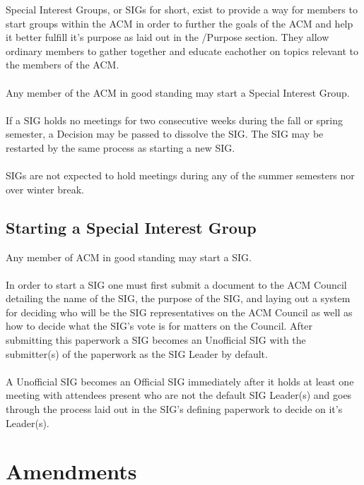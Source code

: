 \documentclass[12pt,titlepage]{article}
\begin{document}
Special Interest Groups, or SIGs for short, exist to provide a way for members to start groups within the ACM in order to further the goals of the ACM and help it better fulfill it's purpose as laid out in the /Purpose section. They allow ordinary members to gather together and educate eachother on topics relevant to the members of the ACM.\\
\\
Any member of the ACM in good standing may start a Special Interest Group.\\
\\
If a SIG holds no meetings for two consecutive weeks during the fall or spring semester, a Decision may be passed to dissolve the SIG. The SIG may be restarted by the same process as starting a new SIG.\\
\\
SIGs are not expected to hold meetings during any of the summer semesters nor over winter break.

\subsection{Starting a Special Interest Group}

Any member of ACM in good standing may start a SIG.\\
\\
In order to start a SIG one must first submit a document to the ACM Council detailing the name of the SIG, the purpose of the SIG, and laying out a system for deciding who will be the SIG representatives on the ACM Council as well as how to decide what the SIG's vote is for matters on the Council. After submitting this paperwork a SIG becomes an Unofficial SIG with the submitter(s) of the paperwork as the SIG Leader by default.\\
\\
A Unofficial SIG becomes an Official SIG immediately after it holds at least one meeting with attendees present who are not the default SIG Leader(s) and goes through the process laid out in the SIG's defining paperwork to decide on it's Leader(s).

\section{Amendments}
\end{document}
